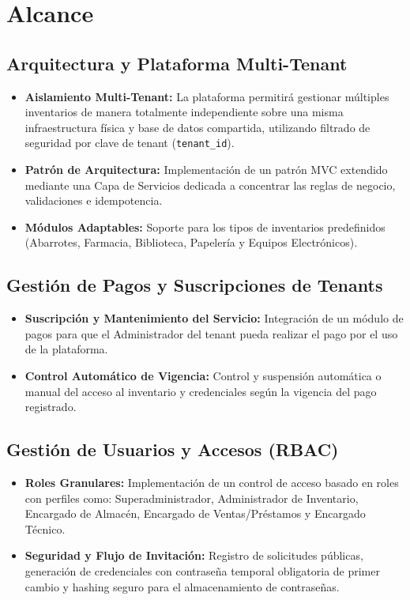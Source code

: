 \section{Alcance}

\subsection{Arquitectura y Plataforma Multi-Tenant}

\begin{itemize}
    \item \textbf{Aislamiento Multi-Tenant:} La plataforma permitirá gestionar múltiples inventarios de manera totalmente independiente sobre una misma infraestructura física y base de datos compartida, utilizando filtrado de seguridad por clave de tenant (\texttt{tenant\_id}).

    \item \textbf{Patrón de Arquitectura:} Implementación de un patrón MVC extendido mediante una Capa de Servicios dedicada a concentrar las reglas de negocio, validaciones e idempotencia.

    \item \textbf{Módulos Adaptables:} Soporte para los tipos de inventarios predefinidos (Abarrotes, Farmacia, Biblioteca, Papelería y Equipos Electrónicos).
\end{itemize}

\subsection{Gestión de Pagos y Suscripciones de Tenants}

\begin{itemize}
    \item \textbf{Suscripción y Mantenimiento del Servicio:} Integración de un módulo de pagos para que el Administrador del tenant pueda realizar el pago por el uso de la plataforma.

    \item \textbf{Control Automático de Vigencia:} Control y suspensión automática o manual del acceso al inventario y credenciales según la vigencia del pago registrado.
\end{itemize}

\subsection{Gestión de Usuarios y Accesos (RBAC)}

\begin{itemize}
    \item \textbf{Roles Granulares:} Implementación de un control de acceso basado en roles con perfiles como: Superadministrador, Administrador de Inventario, Encargado de Almacén, Encargado de Ventas/Préstamos y Encargado Técnico.

    \item \textbf{Seguridad y Flujo de Invitación:} Registro de solicitudes públicas, generación de credenciales con contraseña temporal obligatoria de primer cambio y hashing seguro para el almacenamiento de contraseñas.
\end{itemize}

